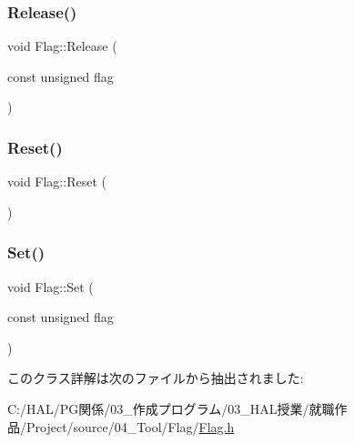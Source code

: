 \subsubsection{\texorpdfstring{Release()}{Release()}}
{\footnotesize\ttfamily void Flag\+::\+Release (\begin{DoxyParamCaption}\item[{const unsigned}]{flag }\end{DoxyParamCaption})\hspace{0.3cm}{\ttfamily [inline]}}

\mbox{\label{class_flag_aef13ac09901558208fa1d8b63549c2ae}} 
\subsubsection{\texorpdfstring{Reset()}{Reset()}}
{\footnotesize\ttfamily void Flag\+::\+Reset (\begin{DoxyParamCaption}{ }\end{DoxyParamCaption})\hspace{0.3cm}{\ttfamily [inline]}}

\mbox{\label{class_flag_a362d2f64c03c0b596004f3eba4cb14a3}} 
\subsubsection{\texorpdfstring{Set()}{Set()}}
{\footnotesize\ttfamily void Flag\+::\+Set (\begin{DoxyParamCaption}\item[{const unsigned}]{flag }\end{DoxyParamCaption})\hspace{0.3cm}{\ttfamily [inline]}}



このクラス詳解は次のファイルから抽出されました\+:\begin{DoxyCompactItemize}
\item 
C\+:/\+H\+A\+L/\+P\+G関係/03\+\_\+作成プログラム/03\+\_\+\+H\+A\+L授業/就職作品/\+Project/source/04\+\_\+\+Tool/\+Flag/\mbox{\hyperlink{_flag_8h}{Flag.\+h}}\end{DoxyCompactItemize}
